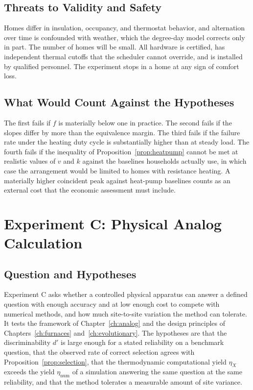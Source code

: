 \subsection*{Threats to Validity and Safety}

Homes differ in insulation, occupancy, and thermostat behavior, and alternation over time is confounded with weather, which the degree-day model corrects only in part. The number of homes will be small. All hardware is certified, has independent thermal cutoffs that the scheduler cannot override, and is installed by qualified personnel. The experiment stops in a home at any sign of comfort loss.

\subsection*{What Would Count Against the Hypotheses}

The first fails if $f$ is materially below one in practice. The second fails if the slopes differ by more than the equivalence margin. The third fails if the failure rate under the heating duty cycle is substantially higher than at steady load. The fourth fails if the inequality of Proposition~\ref{prop:heatpump} cannot be met at realistic values of $v$ and $k$ against the baselines households actually use, in which case the arrangement would be limited to homes with resistance heating. A materially higher coincident peak against heat-pump baselines counts as an external cost that the economic assessment must include.

\section{Experiment C: Physical Analog Calculation}

\subsection*{Question and Hypotheses}

Experiment C asks whether a controlled physical apparatus can answer a defined question with enough accuracy and at low enough cost to compete with numerical methods, and how much site-to-site variation the method can tolerate. It tests the framework of Chapter~\ref{ch:analog} and the design principles of Chapters~\ref{ch:furnaces} and~\ref{ch:evolutionary}. The hypotheses are that the discriminability $d'$ is large enough for a stated reliability on a benchmark question, that the observed rate of correct selection agrees with Proposition~\ref{prop:selection}, that the thermodynamic computational yield $\eta_X$ exceeds the yield $\eta_{\mathrm{num}}$ of a simulation answering the same question at the same reliability, and that the method tolerates a measurable amount of site variance.

